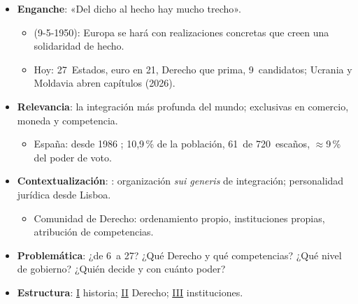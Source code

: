 \documentclass{article}
\begin{document}
\cabecerarepaso
\begin{columnas}

\begin{itemize}
\item \textbf{Enganche}: «Del dicho al hecho hay mucho trecho».
  \begin{itemize}
  \item {} (9-5-1950): Europa se hará con realizaciones concretas que creen una solidaridad de hecho.
  \item Hoy: 27~Estados, euro en 21, Derecho que prima, 9~candidatos; Ucrania y Moldavia abren capítulos (2026).
  \end{itemize}
\item \textbf{Relevancia}: la integración más profunda del mundo; exclusivas en comercio, moneda y competencia.
  \begin{itemize}
  \item España: desde 1986 ; 10,9\,\% de la población, 61~de 720~escaños, $\approx$9\,\% del poder de voto.
  \end{itemize}
\item \textbf{Contextualización}: : organización \emph{sui generis} de integración; personalidad jurídica desde Lisboa.
  \begin{itemize}
  \item Comunidad de Derecho: ordenamiento propio, instituciones propias, atribución de competencias.
  \end{itemize}
\item \textbf{Problemática}: ¿de 6~a 27? ¿Qué Derecho y qué competencias? ¿Qué nivel de gobierno? ¿Quién decide y con cuánto poder?
\item \textbf{Estructura}: \hyperref[rep:I]{I} historia; \hyperref[rep:II]{II} Derecho; \hyperref[rep:III]{III} instituciones.
\end{itemize}


\end{columnas}
\end{document}
